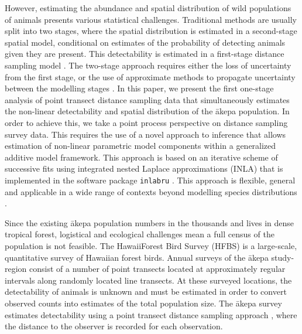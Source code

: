 \documentclass{statsoc}
\newcommand{\akepa}{\textquotesingle\={a}kepa}  %
\newcommand{\hawaii}{Hawai\textquotesingle i}   %
\begin{document}
However, estimating the abundance and spatial distribution of wild populations of animals presents various statistical challenges. Traditional methods are usually split into two stages, where the spatial distribution is estimated in a second-stage spatial model, conditional on estimates of the probability of detecting animals given they are present.  This detectability is estimated in a first-stage distance sampling model \citep{millerExtendingDensitySurface2021, miller_spatial_2013}.  The two-stage approach requires either the loss of uncertainty from the first stage, or the use of approximate methods to propagate uncertainty between the modelling stages \citep{bravington_VariancePropagationDensity_2021}.  In this paper, we present the first one-stage analysis of point transect distance sampling data that simultaneously estimates the non-linear detectability and spatial distribution of the \akepa{} population.  In order to achieve this, we take a point process perspective on distance sampling survey data. This requires the use of a novel approach to inference that allows estimation of non-linear parametric model components within a generalized additive model framework. This approach is based on an iterative scheme of successive fits using integrated nested Laplace approximations (INLA) \citep{rue_approximate_2009} that is implemented in the software package \texttt{inlabru} \citep{lindgren_inlabru_2024}.  This approach is flexible, general and applicable in a wide range of contexts beyond modelling species distributions \citep{serafini2023approximation, bayliss2022pseudo}.

Since the existing \akepa{} population numbers in the thousands and lives in dense tropical forest, logistical and ecological challenges mean a full census of the population is not feasible. The \hawaii Forest Bird Survey (HFBS) \citep{scott_HFBS_1986} is a large-scale, quantitative survey of Hawaiian forest birds.  Annual surveys of the \akepa{} study-region consist of a number of point transects located at approximately regular intervals along randomly located line transects.  At these surveyed locations, the detectability of animals is unknown and must be estimated in order to convert observed counts into estimates of the total population size.  The \akepa{} survey estimates detectability using a point transect distance sampling approach \citep{buckland_distance_2015}, where the distance to the observer is recorded for each observation.
\end{document}
